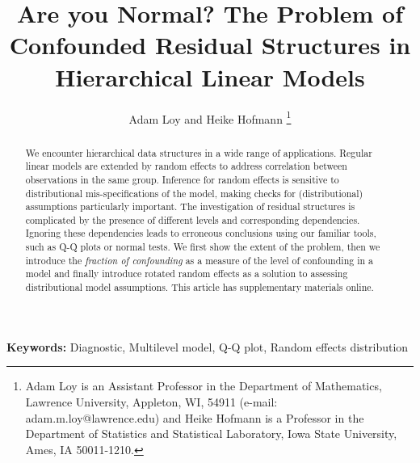 \documentclass[12pt]{article} %
\begin{document}
\title{Are you Normal? The Problem of Confounded Residual Structures in Hierarchical Linear Models}
\author{{Adam Loy and Heike Hofmann}
\thanks{Adam Loy is an Assistant Professor in the Department of Mathematics, Lawrence University, Appleton, WI, 54911 (e-mail: adam.m.loy@lawrence.edu) and Heike Hofmann is a Professor in the Department of Statistics and Statistical Laboratory, Iowa State University, Ames, IA 50011-1210.}}

\maketitle


\begin{abstract}
We encounter hierarchical data structures in a wide range of applications. Regular linear models are extended by random effects to address correlation between observations in the same group. Inference for random effects is sensitive to  distributional mis-specifications of the model, making checks for (distributional) assumptions particularly important.  The investigation of residual structures is complicated by the presence of  different levels and corresponding  dependencies. Ignoring these dependencies leads to  erroneous conclusions using our familiar tools, such as Q-Q plots or normal tests. We first show the extent of the problem, then we introduce the {\it fraction of confounding} as a measure of the level of confounding in a model and finally introduce rotated random effects as a solution to assessing distributional model assumptions. This article has supplementary materials online.
\end{abstract}
{\bf Keywords:} Diagnostic, Multilevel model, Q-Q plot, Random effects distribution


\end{document}
